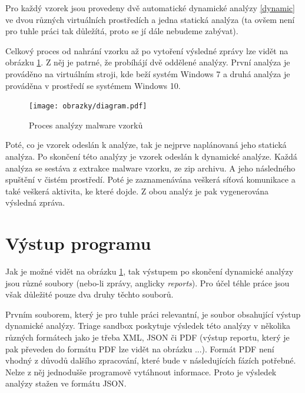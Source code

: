Pro každý vzorek jsou provedeny dvě automatické dynamické analýzy \ref{dynamic} ve dvou různých virtuálních prostředích a jedna statická analýza (ta ovšem není pro tuhle práci tak důležítá, proto se jí dále nebudeme zabývat). 

Celkový proces od nahrání vzorku až po vytoření výsledné zprávy lze vidět na obrázku \ref{Analysis_diagram}. Z něj je patrné, že probíhájí dvě oddělené analýzy. První analýza je prováděno na virtuálním stroji, kde beží 
systém Windows 7 a druhá analýza je prováděna v prostředí se systémem Windows 10.

\begin{figure}[h]
	\centering
        \texttt{[image: obrazky/diagram.pdf]}
	\caption{Proces analýzy malware vzorků}
    \label{Analysis_diagram}
\end{figure}

Poté, co je vzorek odeslán k analýze, tak je nejprve naplánovaná jeho statická analýza. Po skončení této analýzy je vzorek odeslán k dynamické analýze. Každá analýza se sestáva z extrakce malware vzorku, ze zip archivu. A jeho následného spuštění v čistém prostředí. Poté je zaznamenávána veškerá síťová komunikace a také veškerá aktivita, ke které dojde.
Z obou analýz je pak vygenerována výsledná zpráva.
\section{Výstup programu}
Jak je možné vidět na obrázku \ref{Analysis_diagram}, tak výstupem po skončení dynamické analýzy jsou různé soubory (nebo-li zprávy, anglicky \textit{reports}). Pro účel téhle práce jsou však důležité pouze dva druhy těchto souborů.

Prvním souborem, který je pro tuhle práci relevantní, je soubor obsahující výstup dynamické analýzy. Triage sandbox poskytuje výsledek této analýzy v několika různých formátech jako je třeba XML, JSON či PDF (výstup reportu, který je pak převeden do formátu PDF lze vidět na obrázku ...).
Formát PDF není vhodný z důvodů dalšího zpracování, které bude v následujících fázích potřebné. Nelze z něj jednodušše programově vytáhnout informace. Proto je výsledek analýzy stažen ve formátu JSON.


